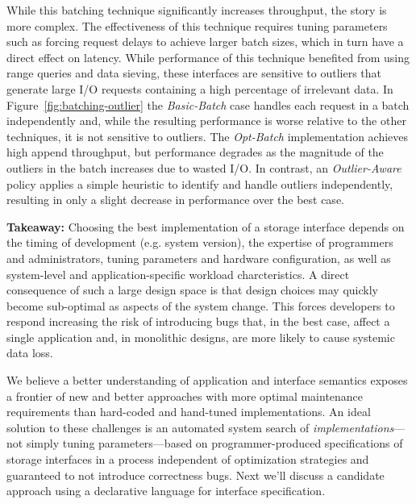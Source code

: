 While this batching technique significantly increases throughput, the story is
more complex. The effectiveness of this technique requires tuning parameters
such as forcing request delays to achieve larger batch sizes, which in turn
have a direct effect on latency. While performance of this technique benefited
from using range queries and data sieving, these interfaces are sensitive to
outliers that generate large I/O requests containing a high percentage of
irrelevant data.  In Figure~\ref{fig:batching-outlier} the \emph{Basic-Batch}
case handles each request in a batch independently and, while the resulting
performance is worse relative to the other techniques, it is not sensitive to
outliers. The \emph{Opt-Batch} implementation achieves high append throughput,
but performance degrades as the magnitude of the outliers in the batch
increases due to wasted I/O. In contrast, an \emph{Outlier-Aware} policy
applies a simple heuristic to identify and handle outliers independently,
resulting in only a slight decrease in performance over the best case.

\textbf{Takeaway:} Choosing the best implementation of a storage interface
depends on the timing of development (e.g. system version), the expertise of
programmers and administrators, tuning parameters and hardware configuration,
as well as system-level and application-specific workload charcteristics. A
direct consequence of such a large design space is that design choices may
quickly become sub-optimal as aspects of the system change.  This forces
developers to respond increasing the risk of introducing bugs that, in the
best case, affect a single application and, in monolithic designs, are more
likely to cause systemic data loss.

We believe a better understanding of application and interface semantics
exposes a frontier of new and better approaches with more optimal maintenance
requirements than hard-coded and hand-tuned implementations. An ideal solution
to these challenges is an automated system search of
\emph{implementations}---not simply tuning parameters---based on
programmer-produced specifications of storage interfaces in a process
independent of optimization strategies and guaranteed to not introduce
correctness bugs. Next we'll discuss a candidate approach using a declarative
language for interface specification.
